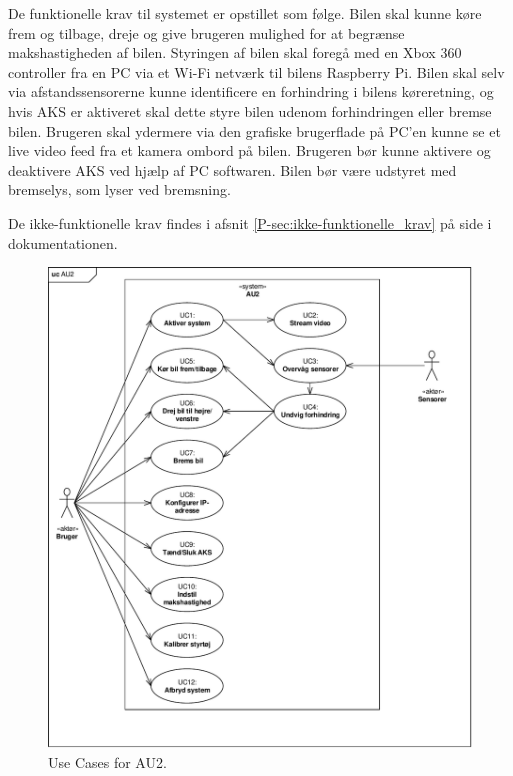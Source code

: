 De funktionelle krav til systemet er opstillet som følge. Bilen skal kunne køre frem og tilbage, dreje og give brugeren mulighed for at begrænse makshastigheden af bilen. 
Styringen af bilen skal foregå med en Xbox 360 controller fra en PC via et Wi-Fi netværk til bilens Raspberry Pi.
Bilen skal selv via afstandssensorerne kunne identificere en forhindring i bilens køreretning, og hvis AKS er aktiveret skal dette styre bilen udenom forhindringen eller bremse bilen.
Brugeren skal ydermere via den grafiske brugerflade på PC'en kunne se et live video feed fra et kamera ombord på bilen.
Brugeren bør kunne aktivere og deaktivere AKS ved hjælp af PC softwaren.
Bilen bør være udstyret med bremselys, som lyser ved bremsning.

De ikke-funktionelle krav findes i afsnit \ref{P-sec:ikke-funktionelle_krav}  på side \pageref{P-sec:ikke-funktionelle_krav} i dokumentationen.

\clearpage

\begin{figure}[h]
\centering
\includegraphics[width=\textwidth]{../fig/diagrammer/uc_au2}
\caption{Use Cases for AU2.}
\label{fig:use_cases}
\end{figure}